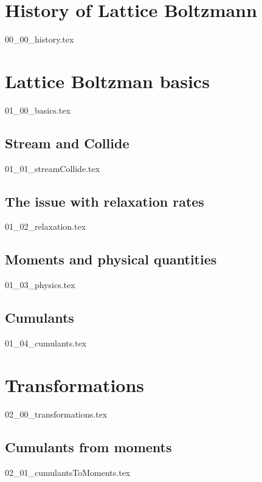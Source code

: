 \documentclass[12pt,a4paper,twoside]{article}
\begin{document}
\newpage
\tableofcontents
\newpage
\printglossaries{}
\newpage

\pagestyle{headings}
\section{History of Lattice Boltzmann}
\label{sec: History of Lattice Boltzmann}
{00_00_history.tex}

\section{Lattice Boltzman basics}
\label{sec: Lattice Boltzman basics}
{01_00_basics.tex}

\subsection{Stream and Collide}
\label{sub: Stream and Collide}
{01_01_streamCollide.tex}

\subsection{The issue with relaxation rates}
\label{sub: The issue with relaxation rates}
{01_02_relaxation.tex}

\subsection{Moments and physical quantities}
\label{sub: Moments and physical quantities}
{01_03_physics.tex}

\subsection{Cumulants}
\label{sub: Cumulants}
{01_04_cumulants.tex}

\section{Transformations}
\label{sec: Transformations}
{02_00_transformations.tex}

\subsection{Cumulants from moments}
\label{sub: Cumulants from moments}
{02_01_cumulantsToMoments.tex}
\end{document}

